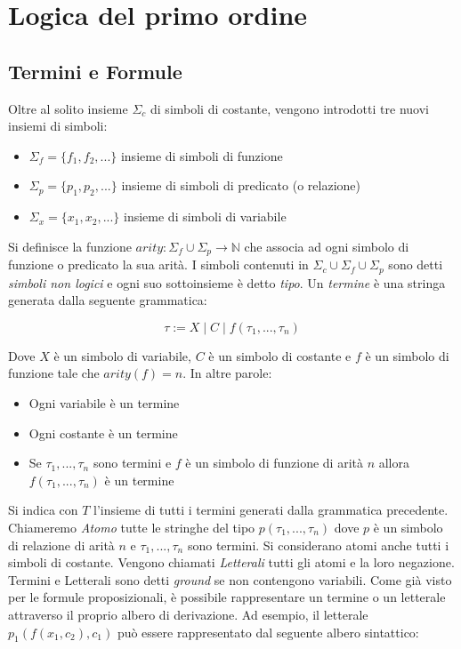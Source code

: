 \documentclass[./main.tex]{subfiles}
\begin{document}

\section{Logica del primo ordine}
  
\subsection{Termini e Formule} \label{sec:sintassi_fof}
Oltre al solito insieme $\Sigma_c$ di simboli di costante, vengono introdotti tre nuovi insiemi di simboli:
\begin{itemize}
  \item $\Sigma_f = \{f_1, f_2, ...\}$ insieme di simboli di funzione
  \item $\Sigma_p = \{p_1, p_2, ...\}$ insieme di simboli di predicato (o relazione)
  \item $\Sigma_x = \{x_1, x_2, ...\}$ insieme di simboli di variabile
\end{itemize}

Si definisce la funzione $arity : \Sigma_f \cup \Sigma_p \rightarrow \mathbb{N}$ che associa ad ogni simbolo di funzione o predicato la sua arità.
I simboli contenuti in $\Sigma_c \cup \Sigma_f \cup \Sigma_p$ sono detti \textit{simboli non logici} e ogni suo sottoinsieme è detto \textit{tipo}.
Un \textit{termine} è una stringa generata dalla seguente grammatica:

$$ \tau := X \mid C \mid f(\tau_1, ..., \tau_n) $$

Dove $X$ è un simbolo di variabile, $C$ è un simbolo di costante e $f$ è un simbolo di funzione tale che $arity(f) = n$. In altre parole:
\begin{itemize}
  \item Ogni variabile è un termine
  \item Ogni costante è un termine
  \item Se $\tau_1, ..., \tau_n$ sono termini e $f$ è un simbolo di funzione di arità $n$ allora $f(\tau_1, ..., \tau_n)$ è un termine
\end{itemize}

Si indica con $T$ l'insieme di tutti i termini generati dalla grammatica precedente.
Chiameremo \textit{Atomo} tutte le stringhe del tipo $p(\tau_1, ..., \tau_n)$ dove $p$ è un simbolo di relazione
di arità $n$ e $\tau_1, ..., \tau_n$ sono termini.
Si considerano atomi anche tutti i simboli di costante.
Vengono chiamati \textit{Letterali} tutti gli atomi e la loro negazione.
Termini e Letterali sono detti \textit{ground} se non contengono variabili.
Come già visto per le formule proposizionali, è possibile rappresentare un termine o un letterale
attraverso il proprio albero di derivazione. Ad esempio, il letterale $p_1(f(x_1, c_2), c_1)$ può essere rappresentato dal seguente albero sintattico:
\end{document}
